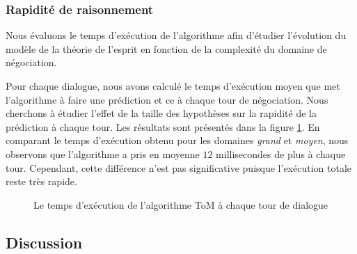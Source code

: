 	
	\subsubsection{Rapidité de raisonnement}
	Nous évaluons le temps d'exécution de l'algorithme afin d'étudier l'évolution du modèle de la théorie de l'esprit en fonction de la complexité du domaine de négociation.
	
	Pour chaque dialogue, nous avons calculé le temps d'exécution moyen que met l'algorithme à faire une prédiction et ce à chaque tour de négociation. 
	Nous cherchons à étudier l'effet de la taille des hypothèses sur la rapidité de la prédiction à chaque tour. Les résultats sont présentés dans la figure \ref{fig:time}. En comparant  le temps d'exécution obtenu pour les domaines \emph{grand} et \emph{moyen}, nous observons que l'algorithme a pris en moyenne $12$ millisecondes de plus à chaque tour. Cependant, cette différence n'est pas significative puisque l'exécution totale reste très rapide.
	\begin{figure}[h]
		\caption{Le temps d'exécution de l'algorithme ToM à chaque tour de dialogue} 
		\label{fig:time}
	\end{figure}
	

	\subsection{Discussion}
	
